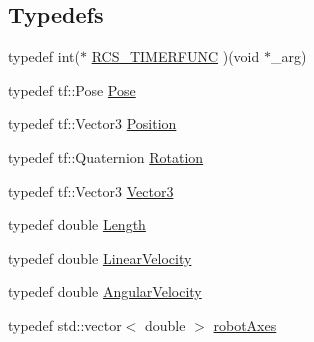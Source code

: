 \subsection*{Typedefs}
\begin{DoxyCompactItemize}
\item 
typedef int($\ast$ \hyperlink{namespaceRCS_ae5dd02ab24956844fae02f10de954ad5}{R\-C\-S\-\_\-\-T\-I\-M\-E\-R\-F\-U\-N\-C} )(void $\ast$\-\_\-arg)
\item 
typedef tf\-::\-Pose \hyperlink{namespaceRCS_aa07e45d8a50e30064283d2b38087f999}{Pose}
\item 
typedef tf\-::\-Vector3 \hyperlink{namespaceRCS_a6080060b617affc23ab1d6309fe7c3cd}{Position}
\item 
typedef tf\-::\-Quaternion \hyperlink{namespaceRCS_a3fd915276fdb632d217c560523c320e0}{Rotation}
\item 
typedef tf\-::\-Vector3 \hyperlink{namespaceRCS_a688a9db9f1e17b76c410c539997d07a7}{Vector3}
\item 
typedef double \hyperlink{namespaceRCS_a86ac9427c1a3f2ec2b94a74888b2cefd}{Length}
\item 
typedef double \hyperlink{namespaceRCS_a20e104cd075c4ca08a073a6261a70a84}{Linear\-Velocity}
\item 
typedef double \hyperlink{namespaceRCS_a3ca212cf7a0c547f5496352e850372a9}{Angular\-Velocity}
\item 
typedef std\-::vector$<$ double $>$ \hyperlink{namespaceRCS_a3185cefb4d61f5c6f364aaf5624a3ee4}{robot\-Axes}
\end{DoxyCompactItemize}
